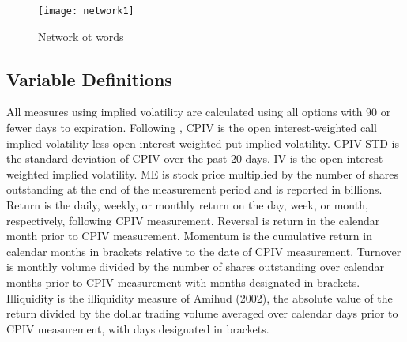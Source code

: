 \begin{figure}[h]
\centering
\texttt{[image: network1]}
\caption{Network ot words}
\label{fig:Network}
\end{figure}


\subsection{Variable Definitions}
All measures using implied volatility are calculated using all options with 90 or fewer days to expiration. Following \textcite{cremers2010deviations}, CPIV is the open interest-weighted call implied volatility less open interest weighted put implied volatility. CPIV STD is the standard deviation of CPIV over the past 20 days. IV is the open interest-weighted implied volatility. ME is stock price multiplied by the number of shares outstanding at the end of the measurement period and is reported in billions. Return is the daily, weekly, or monthly return on the day, week, or month, respectively, following CPIV measurement. Reversal is return in the calendar month prior to CPIV measurement. Momentum is the cumulative return in calendar months in brackets relative to the date of CPIV measurement. Turnover is monthly 
volume divided by the number of shares outstanding over calendar months prior to CPIV measurement with months designated in brackets. Illiquidity is the illiquidity measure of Amihud (2002), the absolute value of the return divided by the dollar trading volume averaged over calendar days prior to CPIV measurement, with days designated in brackets.

